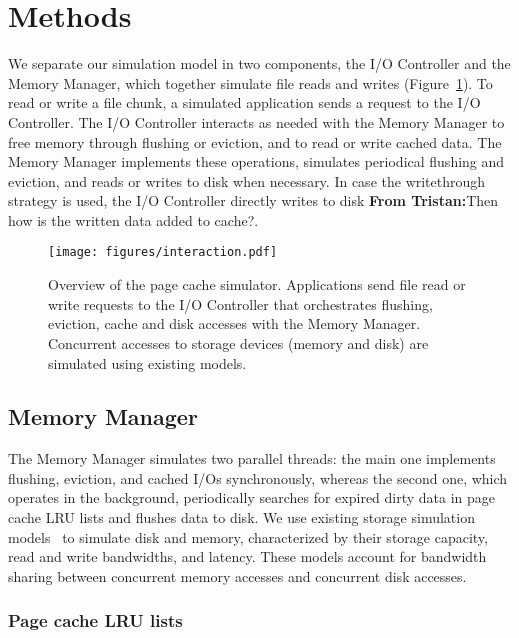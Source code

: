 \documentclass[conference]{IEEEtran}
\newcommand{\tristan}[1]{\color{orange}\textbf{From Tristan:}#1\color{black}}
\begin{document}
    \section{Methods}
    \label{method}
    We separate our simulation model in two components, the I/O
    Controller and the Memory Manager, which together simulate
    file reads and writes (Figure~\ref{fig:interaction}).
    To read or write a file chunk, a simulated application sends a
    request to the I/O Controller. The I/O Controller interacts as needed with
    the Memory Manager to free memory through flushing or eviction,
    and to read or write cached data. The Memory Manager
    implements these operations, simulates periodical flushing
    and eviction, and reads or writes to disk when necessary.
    In case the writethrough strategy is used, the I/O Controller directly
    writes to disk \tristan{Then how is the written data added to cache?}.

    \begin{figure}
           \centering
           \texttt{[image: figures/interaction.pdf]}
           \caption{Overview of the page cache simulator.
           Applications send file read or write requests to the
           I/O Controller that orchestrates flushing, eviction, cache
           and disk accesses with the Memory Manager. Concurrent accesses to storage
           devices (memory and disk) are simulated using existing models.}
           \label{fig:interaction}
    \end{figure}

    \subsection{Memory Manager}

    The Memory Manager simulates two parallel threads: the main one
    implements flushing, eviction, and cached I/Os synchronously, whereas
    the second one, which operates in the background, periodically searches for
    expired dirty data in page cache LRU lists and flushes data to disk. We
    use existing storage simulation models~\cite{lebre2015} to simulate disk and
    memory, characterized by their storage capacity, read and write
    bandwidths, and latency. These models account for
    bandwidth sharing between concurrent memory accesses and concurrent disk accesses.

    \subsubsection{Page cache LRU lists}
\end{document}
